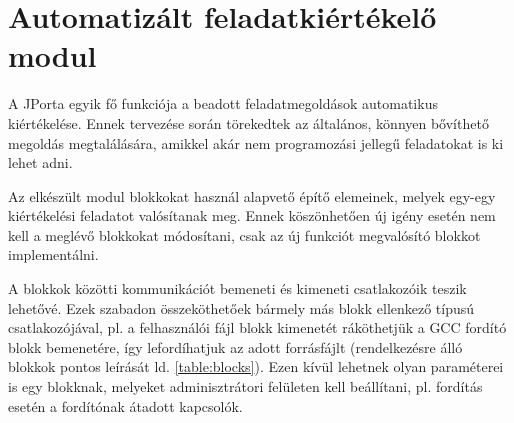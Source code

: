 \chapter{Automatizált feladatkiértékelő modul}\label{chapter:exercise}

A JPorta egyik fő funkciója a beadott feladatmegoldások automatikus kiértékelése. Ennek tervezése során törekedtek az általános, könnyen bővíthető megoldás megtalálására, amikkel akár nem programozási jellegű feladatokat is ki lehet adni. \cite{DudiMsc}

Az elkészült modul blokkokat használ alapvető építő elemeinek, melyek egy-egy kiértékelési feladatot valósítanak meg. Ennek köszönhetően új igény esetén nem kell a meglévő blokkokat módosítani, csak az új funkciót megvalósító blokkot implementálni.

A blokkok közötti kommunikációt bemeneti és kimeneti csatlakozóik teszik lehetővé. Ezek szabadon összeköthetőek bármely más blokk ellenkező típusú csatlakozójával, pl. a felhasználói fájl blokk kimenetét ráköthetjük a GCC fordító blokk bemenetére, így lefordíhatjuk az adott forrásfájlt (rendelkezésre álló blokkok pontos leírását ld. \ref{table:blocks}). Ezen kívül lehetnek olyan paraméterei is egy blokknak, melyeket adminisztrátori felületen kell beállítani, pl. fordítás esetén a fordítónak átadott kapcsolók.

